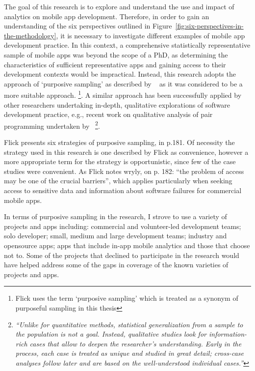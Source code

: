 The goal of this research is to explore and understand the use and impact of analytics on mobile app development. %
Therefore, in order to gain an understanding of the six perspectives outlined in Figure~\ref{fig:six-perspectives-in-the-methodology}, it is necessary to investigate different examples of mobile app development practice. In this context, a comprehensive statistically representative sample of mobile apps was beyond the scope of a PhD, as determining the characteristics of sufficient representative apps and gaining access to their development contexts would be impractical. Instead, this research adopts the approach of `purposive sampling'  as described by ~\citep[pp. 180-182]{flick2018_an_introduction_to_qualitative_research_sixth_ed} as it was considered to be a more suitable approach. \footnote{Flick uses the term `purposive sampling' which is treated as a synonym of purposeful sampling in this thesis}. A similar approach has been successfully applied by other researchers undertaking in-depth, qualitative explorations of software development practice, e.g., recent work on qualitative analysis of pair programming undertaken by ~\citep[p.114]{zieris2020_phd_qualitative_analysis_of_knowledge_transfer_in_pair_programming}\footnote{\emph{``Unlike for quantitative methods, statistical generalization from a sample to the population is not a goal. Instead, qualitative studies look for information-rich cases that allow to deepen the researcher’s understanding. Early in the process, each case is treated as unique and studied in great detail; cross-case analyses follow later and are based on the well-understood individual cases.''}}. 

Flick presents six strategies of purposive sampling, in p.181. Of necessity the strategy used in this research is one described by Flick as convenience, however a more appropriate term for the strategy is opportunistic, since few of the case studies were convenient. As Flick notes wryly, on p. 182: ``the problem of access may be one of the crucial barriers'', which applies particularly when seeking access to sensitive data and information about software failures for commercial mobile apps.

In terms of purposive sampling in the research, I strove to use a variety of projects and apps including: commercial and volunteer-led development teams; solo developer; small, medium and large development teams; industry and opensource apps; apps that include in-app mobile analytics and those that choose not to. Some of the projects that declined to participate in the research would have helped address some of the gaps in coverage of the known varieties of projects and apps.

